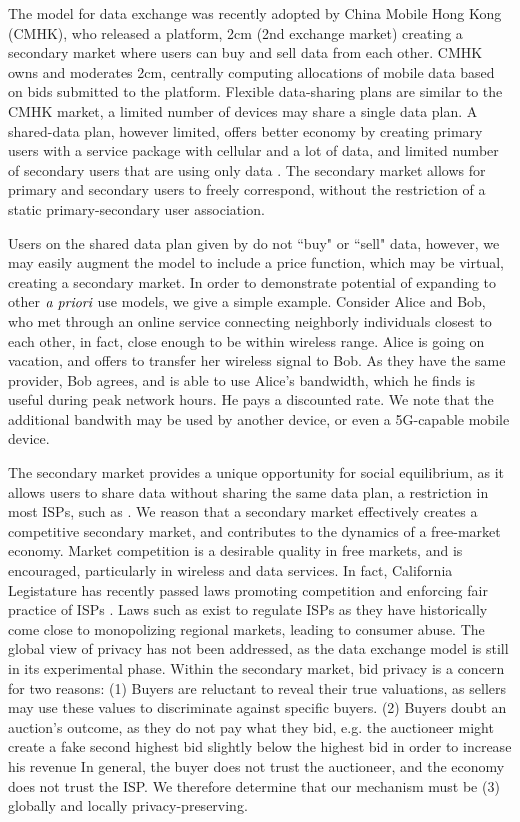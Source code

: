 The model for data exchange was recently adopted by China Mobile Hong Kong
(CMHK), who released a platform, 2cm (2nd exchange market) creating a secondary
market where users can buy and sell data from each other.
CMHK owns and moderates 2cm, centrally computing allocations of mobile data
based on bids submitted to the platform.
Flexible data-sharing
plans are similar to the CMHK market, a limited number of devices may
share a single data plan. A shared-data plan, however limited, offers better economy
by creating primary users with a service package with cellular and a lot of data, and
limited number of secondary users that are using only data \cite{att}.
The secondary market allows for primary and secondary users to freely correspond,
without the restriction of a static primary-secondary user association.

Users on the shared data plan given by \cite{att} do not ``buy" or ``sell"
data, however, we may easily augment the model to include a price function,
which may be virtual, creating a secondary market.
In order to demonstrate potential of expanding to other $\emph{a priori}$ use
models, we give a simple example. Consider Alice and Bob, who met through an online service connecting neighborly
individuals closest to each other, in fact, close enough to be within wireless
range. Alice is going on vacation, and offers to transfer her wireless signal to
Bob. As they have the same provider, Bob agrees, and is able to use Alice's
bandwidth, which he finds is useful during peak network
hours. He pays a discounted rate. We note that the additional bandwith may be
used by another device, or even a 5G-capable mobile device.

The secondary market provides a unique opportunity for social equilibrium, as it
allows users to share data without sharing the same data plan, a restriction in
most ISPs, such as \cite{att}. We reason that a secondary market effectively creates a competitive secondary market, and contributes to the
dynamics of a free-market economy. Market competition is a desirable quality in
free markets, and is encouraged, particularly in wireless and data services. In
fact, California Legistature has recently passed laws promoting
competition and enforcing fair practice of ISPs \cite{cabill}.
Laws such as \cite{fedbill} exist to
regulate ISPs as they have historically come close to monopolizing regional
markets, leading to consumer abuse.
The global view of privacy has not been addressed, as the data exchange model is still
in its experimental phase.
Within the secondary market, bid privacy is a concern for two reasons: (1) Buyers are reluctant to
reveal their true valuations, as sellers may use these values to discriminate
against specific buyers. (2) Buyers doubt an auction's outcome, as they do
not pay what they bid, e.g. the auctioneer might create a fake
second highest bid slightly below the highest bid in order to increase his revenue
In general, the buyer does not trust the auctioneer, and the economy does not
trust the ISP.
We therefore determine that our mechanism must be (3) globally and locally privacy-preserving. 

